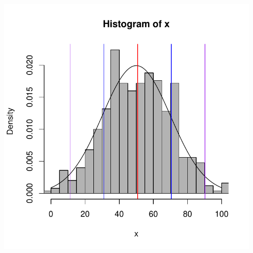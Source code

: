 \documentclass{beamer}\usepackage[]{graphicx}\usepackage[]{color}
\newenvironment{knitrout}{}{} %
\renewenvironment{knitrout}{\setlength{\topsep}{0mm}}{}
\begin{document}
\begin{frame}[fragile]
\begin{columns}[c]
\centering
\begin{knitrout}
\color{fgcolor}
\includegraphics[width=1.1\linewidth]{figure/unnamed-chunk-6-1} 

\end{knitrout}

\end{columns}

\end{frame} 
\end{document}
